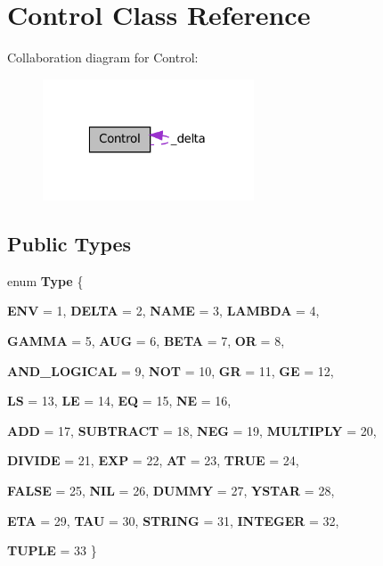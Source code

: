 \hypertarget{classControl}{
\section{Control Class Reference}
\label{classControl}
}


Collaboration diagram for Control:\nopagebreak
\begin{figure}[H]
\begin{center}
\leavevmode
\includegraphics[width=178pt]{classControl__coll__graph}
\end{center}
\end{figure}
\subsection*{Public Types}
\begin{DoxyCompactItemize}
\item 
enum {\bfseries Type} \{ \par
{\bfseries ENV} =  1, 
{\bfseries DELTA} =  2, 
{\bfseries NAME} =  3, 
{\bfseries LAMBDA} =  4, 
\par
{\bfseries GAMMA} =  5, 
{\bfseries AUG} =  6, 
{\bfseries BETA} =  7, 
{\bfseries OR} =  8, 
\par
{\bfseries AND\_\-LOGICAL} =  9, 
{\bfseries NOT} =  10, 
{\bfseries GR} =  11, 
{\bfseries GE} =  12, 
\par
{\bfseries LS} =  13, 
{\bfseries LE} =  14, 
{\bfseries EQ} =  15, 
{\bfseries NE} =  16, 
\par
{\bfseries ADD} =  17, 
{\bfseries SUBTRACT} =  18, 
{\bfseries NEG} =  19, 
{\bfseries MULTIPLY} =  20, 
\par
{\bfseries DIVIDE} =  21, 
{\bfseries EXP} =  22, 
{\bfseries AT} =  23, 
{\bfseries TRUE} =  24, 
\par
{\bfseries FALSE} =  25, 
{\bfseries NIL} =  26, 
{\bfseries DUMMY} =  27, 
{\bfseries YSTAR} =  28, 
\par
{\bfseries ETA} =  29, 
{\bfseries TAU} =  30, 
{\bfseries STRING} =  31, 
{\bfseries INTEGER} =  32, 
\par
{\bfseries TUPLE} =  33
 \}
\end{DoxyCompactItemize}

